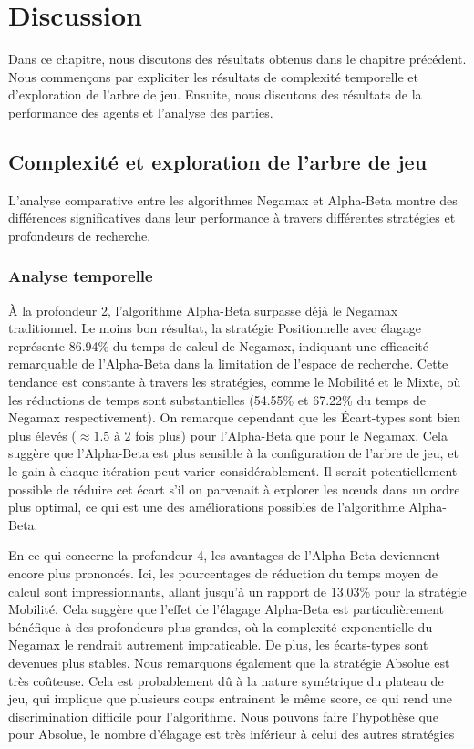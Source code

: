 \chapter{Discussion}
\label{chap:discussion}

Dans ce chapitre, nous discutons des résultats obtenus dans le chapitre précédent. Nous commençons par expliciter les résultats de complexité temporelle et d'exploration de l'arbre de jeu. Ensuite, nous discutons des résultats de la performance des agents et l'analyse des parties.

\section{Complexité et exploration de l'arbre de jeu}
L'analyse comparative entre les algorithmes Negamax et Alpha-Beta montre des différences significatives dans leur performance à travers différentes stratégies et profondeurs de recherche.

\subsection{Analyse temporelle}
À la profondeur 2, l'algorithme Alpha-Beta surpasse déjà le Negamax traditionnel. Le moins bon résultat, la  stratégie Positionnelle avec élagage représente 86.94\% du temps de calcul de Negamax, indiquant une efficacité remarquable de l'Alpha-Beta dans la limitation de l'espace de recherche. Cette tendance est constante à travers les stratégies, comme le Mobilité et le Mixte, où les réductions de temps sont substantielles (54.55\% et 67.22\% du temps de Negamax respectivement). On remarque cependant que les Écart-types sont bien plus élevés ($\approx 1.5 \,\, \text{à} \,\, 2$ fois plus) pour l'Alpha-Beta que pour le Negamax. Cela suggère que l'Alpha-Beta est plus sensible à la configuration de l'arbre de jeu, et le gain à chaque itération peut varier considérablement. Il serait potentiellement possible de réduire cet écart s'il on parvenait à explorer les nœuds dans un ordre plus optimal, ce qui est une des améliorations possibles de l'algorithme Alpha-Beta.

En ce qui concerne la profondeur 4, les avantages de l'Alpha-Beta deviennent encore plus prononcés. Ici, les pourcentages de réduction du temps moyen de calcul sont impressionnants, allant jusqu'à un rapport de 13.03\% pour la stratégie Mobilité. Cela suggère que l'effet de l'élagage Alpha-Beta est particulièrement bénéfique à des profondeurs plus grandes, où la complexité exponentielle du Negamax le rendrait autrement impraticable. De plus, les écarts-types sont devenues plus stables. Nous remarquons également que la stratégie Absolue est très coûteuse. Cela est probablement dû à la nature symétrique du plateau de jeu, qui implique que plusieurs coups entrainent le même score, ce qui rend une discrimination difficile pour l'algorithme. Nous pouvons faire l'hypothèse que pour Absolue, le nombre d'élagage est très inférieur à celui des autres stratégies

